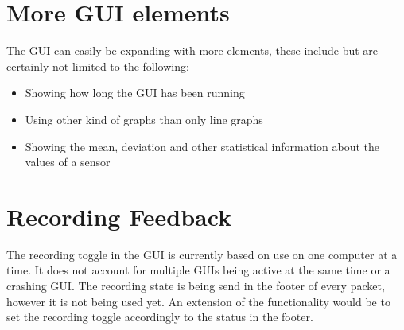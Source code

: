 \section{More GUI elements}
The GUI can easily be expanding with more elements, these include but are certainly not limited to the following:

\begin{itemize}
	\item Showing how long the GUI has been running
	\item Using other kind of graphs than only line graphs
	\item Showing the mean, deviation and other statistical information about the values of a sensor
\end{itemize}

\section{Recording Feedback}
The recording toggle in the GUI is currently based on use on one computer at a time. It does not account for multiple GUIs being active at the same time or a crashing GUI. The recording state is being send in the footer of every packet, however it is not being used yet. An extension of the functionality would be to set the recording toggle accordingly to the status in the footer.

